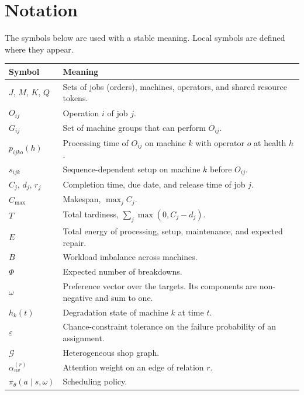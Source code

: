 \documentclass[12pt,a4paper]{report}
\newcommand{\cmax}{C_{\max}}
\newcommand{\1}{\mathbf{1}}
\begin{document}
\tableofcontents
\listoffigures
\listoftables

\chapter*{Notation}
\noindent
The symbols below are used with a stable meaning. Local symbols are defined where they appear.

\begin{longtable}{@{}p{}p{}@{}}
\toprule
Symbol & Meaning \\
\midrule
\endhead
$J$, $M$, $K$, $Q$ & Sets of jobs (orders), machines, operators, and shared resource tokens. \\
$O_{ij}$ & Operation $i$ of job $j$. \\
$G_{ij}$ & Set of machine groups that can perform $O_{ij}$. \\
$p_{ijko}(h)$ & Processing time of $O_{ij}$ on machine $k$ with operator $o$ at health $h$. \\
$s_{ij k}$ & Sequence-dependent setup on machine $k$ before $O_{ij}$. \\
$C_j$, $d_j$, $r_j$ & Completion time, due date, and release time of job $j$. \\
$\cmax$ & Makespan, $\max_j C_j$. \\
$T$ & Total tardiness, $\sum_j \max(0,C_j-d_j)$. \\
$E$ & Total energy of processing, setup, maintenance, and expected repair. \\
$B$ & Workload imbalance across machines. \\
$\Phi$ & Expected number of breakdowns. \\
$\omega$ & Preference vector over the targets. Its components are non-negative and sum to one. \\
$h_k(t)$ & Degradation state of machine $k$ at time $t$. \\
$\varepsilon$ & Chance-constraint tolerance on the failure probability of an assignment. \\
$\mathcal{G}$ & Heterogeneous shop graph. \\
$\alpha_{uv}^{(r)}$ & Attention weight on an edge of relation $r$. \\
$\pi_\theta(a\mid s,\omega)$ & Scheduling policy. \\
\bottomrule
\end{longtable}





\end{document}
